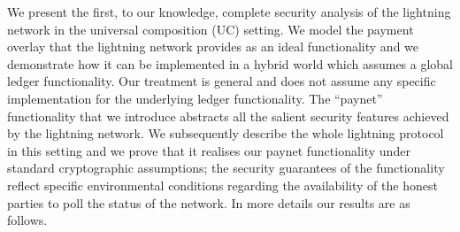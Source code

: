  We present the first, to our knowledge, complete
security analysis of the lightning network in the universal composition (UC)
setting. We model the payment overlay that the lightning network provides as an
ideal functionality and we demonstrate how it can be implemented in a hybrid
world which assumes a global ledger functionality. Our treatment is general and
does not assume any specific implementation for the underlying ledger
functionality. The ``paynet'' functionality that we introduce abstracts all the
salient security features achieved by the lightning network. We subsequently
describe the whole lightning protocol in this setting and we prove that it
realises our paynet functionality under standard cryptographic assumptions; the
security guarantees of the functionality reflect specific environmental
conditions regarding the availability of the honest parties to poll the status
of the network. In more details our results are as follows.

